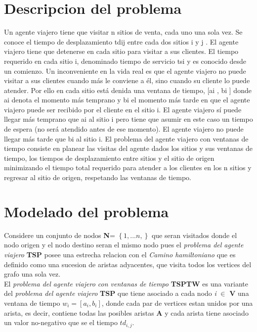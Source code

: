 \documentclass[journal, a4paper]{IEEEtran}
\begin{document}
\section{Descripcion del problema}
Un agente viajero tiene que visitar n sitios de venta, cada uno una sola vez. Se
conoce el tiempo de desplazamiento tdij entre cada dos sitios i y j . El agente
viajero tiene que detenerse en cada sitio para visitar a sus clientes. El tiempo
requerido en cada sitio i, denominado tiempo de servicio tsi y es conocido desde
un comienzo. Un inconveniente en la vida real es que el agente viajero no puede
visitar a sus clientes cuando más le conviene a él, sino cuando su cliente lo puede
atender. Por ello en cada sitio está denida una ventana de tiempo, [ai , bi ] donde
ai denota el momento más temprano y bi el momento más tarde en que el agente
viajero puede ser recibido por el cliente en el sitio i. El agente viajero sí puede
llegar más temprano que ai al sitio i pero tiene que asumir en este caso un
tiempo de espera (no será atendido antes de ese momento). El agente viajero
no puede llegar más tarde que bi al sitio i.
El problema del agente viajero con ventanas de tiempo consiste en planear las
visitas del agente dados los sitios y sus ventanas de tiempo, los tiempos de
desplazamiento entre sitios y el sitio de origen minimizando el tiempo total
requerido para atender a los clientes en los n sitios y regresar al sitio de origen,
respetando las ventanas de tiempo.

\section{Modelado del problema}

Considere un conjunto de nodos \textbf{N}= \(\left \{ 1, . . . n, \right \}\) 
que seran visitados donde el nodo origen y el nodo destino seran el mismo nodo
pues el \textit{ problema del agente viajero } \textbf{TSP} posee una estrecha relacion
con el \textit{Camino hamiltoniano} \cite{hamdef} que es definido como una sucesion de aristas 
adyacentes, que visita todos los vertices del grafo una sola vez.\\

El\textit{ problema del agente viajero con ventanas de tiempo } \textbf{TSPTW} es una variante del 
\textit{ problema del agente viajero } \textbf{TSP} que tiene asociado a cada nodo
\textit{i} \(\in\) \textbf{V}  una ventana de tiempo \( w_{i}= [a_{i},b_{i}]\), 
donde cada par de vertices estan unidos por una arista, es decir, 
contiene todas las posibles aristas \textbf{A} y cada arista tiene asociado 
un valor no-negativo que se el tiempo \(td_{i,j}\).
\end{document}
